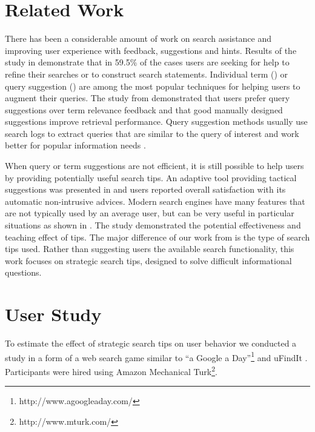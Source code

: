 \documentclass{sig-alternate}
\begin{document}
\section{Related Work}

There has been a considerable amount of work on search assistance and improving user experience with feedback, suggestions and hints.
Results of the study in \cite{xie2009understanding} demonstrate that in 59.5\% of the cases users are seeking for help to refine their searches or to construct search statements.
Individual term (\cite{ruthven2003survey}) or query suggestion (\cite{Bhatia:2011:QSA:2009916.2010023, Cao:2008:CQS:1401890.1401995,Jones:2006:GQS:1135777.1135835}) are among the most popular techniques for helping users to augment their queries.
The study from \cite{Kelly:2009:CQT:1571941.1572006} demonstrated that users prefer query suggestions over term relevance feedback and that good manually designed suggestions improve retrieval performance.
Query suggestion methods usually use search logs to extract queries that are similar to the query of interest and work better for popular information needs \cite{Bhatia:2011:QSA:2009916.2010023}.

When query or term suggestions are not efficient, it is still possible to help users by providing potentially useful search tips.
An adaptive tool providing tactical suggestions was presented in \cite{Kriewel2010} and users reported overall satisfaction with its automatic non-intrusive advices.
Modern search engines have many features that are not typically used by an average user, but can be very useful in particular situations as shown in \cite{Moraveji:2011:MIU:2009916.2009966}. The study demonstrated the potential effectiveness and teaching effect of tips.
The major difference of our work from \cite{Moraveji:2011:MIU:2009916.2009966} is the type of search tips used.
Rather than suggesting users the available search functionality, this work focuses on strategic search tips, designed to solve difficult informational questions.

\section{User Study}

To estimate the effect of strategic search tips on user behavior we conducted a study in a form of a web search game similar to ``a Google a Day''\footnote{http://www.agoogleaday.com/} and uFindIt \cite{Ageev:2011:FYG:2009916.2009965}. Participants were hired using Amazon Mechanical Turk\footnote{http://www.mturk.com/}. 
\end{document}
